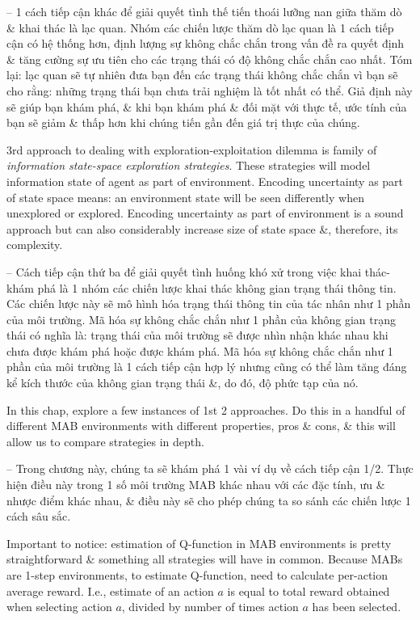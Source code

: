 \documentclass{article}
\begin{document}
\begin{itemize}
\begin{itemize}
\begin{itemize}
            -- 1 cách tiếp cận khác để giải quyết tình thế tiến thoái lưỡng nan giữa thăm dò \& khai thác là lạc quan. Nhóm các chiến lược thăm dò lạc quan là 1 cách tiếp cận có hệ thống hơn, định lượng sự không chắc chắn trong vấn đề ra quyết định \& tăng cường sự ưu tiên cho các trạng thái có độ không chắc chắn cao nhất. Tóm lại: lạc quan sẽ tự nhiên đưa bạn đến các trạng thái không chắc chắn vì bạn sẽ cho rằng: những trạng thái bạn chưa trải nghiệm là tốt nhất có thể. Giả định này sẽ giúp bạn khám phá, \& khi bạn khám phá \& đối mặt với thực tế, ước tính của bạn sẽ giảm \& thấp hơn khi chúng tiến gần đến giá trị thực của chúng.

            3rd approach to dealing with exploration-exploitation dilemma is family of {\it information state-space exploration strategies}. These strategies will model information state of agent as part of environment. Encoding uncertainty as part of state space means: an environment state will be seen differently when unexplored or explored. Encoding uncertainty as part of environment is a sound approach but can also considerably increase size of state space \&, therefore, its complexity.

            -- Cách tiếp cận thứ ba để giải quyết tình huống khó xử trong việc khai thác-khám phá là 1 nhóm các chiến lược khai thác không gian trạng thái thông tin. Các chiến lược này sẽ mô hình hóa trạng thái thông tin của tác nhân như 1 phần của môi trường. Mã hóa sự không chắc chắn như 1 phần của không gian trạng thái có nghĩa là: trạng thái của môi trường sẽ được nhìn nhận khác nhau khi chưa được khám phá hoặc được khám phá. Mã hóa sự không chắc chắn như 1 phần của môi trường là 1 cách tiếp cận hợp lý nhưng cũng có thể làm tăng đáng kể kích thước của không gian trạng thái \&, do đó, độ phức tạp của nó.

            In this chap, explore a few instances of 1st 2 approaches. Do this in a handful of different MAB environments with different properties, pros \& cons, \& this will allow us to compare strategies in depth.

            -- Trong chương này, chúng ta sẽ khám phá 1 vài ví dụ về cách tiếp cận 1/2. Thực hiện điều này trong 1 số môi trường MAB khác nhau với các đặc tính, ưu \& nhược điểm khác nhau, \& điều này sẽ cho phép chúng ta so sánh các chiến lược 1 cách sâu sắc.

            Important to notice: estimation of Q-function in MAB environments is pretty straightforward \& something all strategies will have in common. Because MABs are 1-step environments, to estimate Q-function, need to calculate per-action average reward. I.e., estimate of an action $a$ is equal to total reward obtained when selecting action $a$, divided by number of times action $a$ has been selected.


\end{itemize}
\end{itemize}
\end{itemize}
\end{document}
